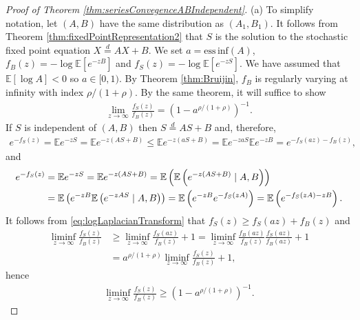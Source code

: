 \documentclass[bj]{imsart}
\numberwithin{equation}{section}
\newcommand{\essinf}{\mathrm{ess\,inf}}
\newcommand{\E}{\mathbb{E}}
\newcommand{\1}{\mathbf{1}}
\theoremstyle{definition}
\begin{document}
\begin{proof}[Proof of Theorem \ref{thm:seriesConvegenceABIndependent}]
(a)
To simplify notation, let $(A,B)$ have the same distribution as $(A_1,B_1)$.
It follows from Theorem \ref{thm:fixedPointRepresentation2}  that $S$ is the solution to the stochastic 
fixed point equation $X\stackrel{d}{=}AX+B$.
We set $a =\essinf(A)$, $f_B(z)=-\log \E[e^{-zB}]$ and $f_S(z)=-\log \E[e^{-zS}]$. 
We have assumed that $\E[\log A]<0$ so $a\in[0,1)$.
By Theorem \ref{thm:Bruijin},
 $f_B$ is regularly varying at infinity with index $\rho/(1+\rho)$. By the same theorem, it will suffice to  show 
\begin{align}\label{n11.3}
\lim_{z\to\infty}\frac{f_S(z)}{f_B(z)}=\left(1-a^{\rho/(1+\rho)}\right)^{-1}.
\end{align}
If $S$ is independent of $(A,B)$ then $S\stackrel{d}{=}AS+B$ and, therefore,
\begin{align}
\label{eq:logLaplacianTransform}
 e^{-f_S(z)}=\E e^{-zS}=\E e^{-z(AS+B)}
\leq \E e^{-z(aS+B)} 
=  \E e^{-zaS} \E e^{-zB} 
= e^{ - f_S(az)-f_B(z)}, 
\end{align}
and
\begin{align}
\label{n11.2}
 e^{-f_S(z)}&=\E e^{-zS}=\E e^{-z(AS+B)}
=\E \left(\E\left( e^{-z(AS+B)} \mid A,B\right)\right)\\
&=\E \left(e^{-zB} \E\left( e^{-zAS}  \mid A,B\right)\right)
=\E \left(e^{-zB} e^{- f_S(zA)}\right)
=\E \left(e^{- f_S(zA)-zB}\right).\notag
\end{align}
It follows from \eqref{eq:logLaplacianTransform} that $f_S(z)\geq f_S(az)+f_B(z)$ and 
\begin{align*}
 \liminf_{z\to\infty}\frac{f_S(z)}{f_B(z)}&\geq \liminf_{z\to\infty} \frac{f_S(az)}{f_B(z)}+1
=\liminf_{z\to\infty} \frac{f_B(az)}{f_B(z)}\frac{f_S(az)}{f_B(az)}+1
\\
&=a^{\rho/(1+\rho)}\liminf_{z\to\infty} \frac{f_S(z)}{f_B(z)}+1,
\end{align*}
hence 
\begin{align}\label{n11.4}
\liminf_{z\to\infty} \frac{f_S(z)}{f_B(z)} \geq \left(1-a^{\rho/(1+\rho)}\right)^{-1}.
\end{align}


\end{proof}
\end{document}
